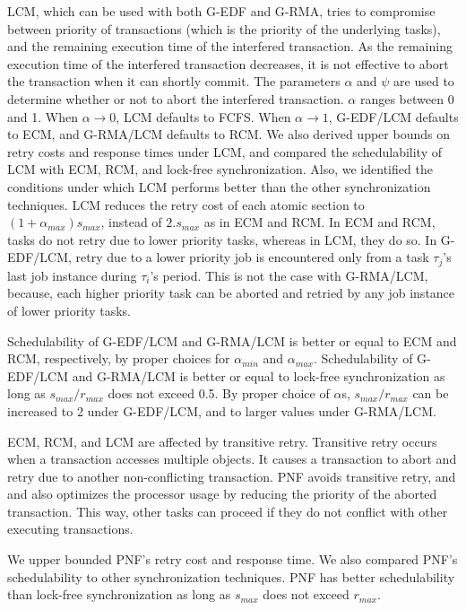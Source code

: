 \documentclass[a4paper,english]{article}
\begin{document}
LCM, which can be used with both G-EDF and G-RMA, tries to compromise between priority of transactions (which is the priority of the underlying tasks), and the remaining execution time of the interfered transaction. As the remaining execution time of the interfered transaction decreases, it is not effective to abort the transaction when it can shortly commit. The parameters $\alpha$ and $\psi$ are used to determine whether or not to abort the interfered transaction. $\alpha$ ranges between 0 and 1. When $\alpha \rightarrow 0$, LCM defaults to FCFS. When $\alpha\rightarrow1$, G-EDF/LCM defaults to ECM, and G-RMA/LCM defaults to RCM. We also derived upper bounds on retry costs and response times under LCM, and compared the schedulability of LCM with ECM, RCM, and lock-free synchronization. Also, we identified the conditions under which LCM performs better than the other synchronization techniques. LCM reduces the retry cost  of each atomic section to $(1+\alpha_{max})s_{max}$, instead of $2.s_{max}$ as in ECM and RCM. In ECM and RCM, tasks do not retry due to lower priority tasks, whereas in LCM, they do so. In G-EDF/LCM, retry due to a lower priority job is encountered only from a task $\tau_{j}$'s last job instance during $\tau_{i}$'s period. This is not the case with G-RMA/LCM, because,  each higher priority task can be aborted and retried by any job instance of lower priority tasks. 

Schedulability of G-EDF/LCM and G-RMA/LCM is better or equal to ECM and RCM, respectively, by proper choices for $\alpha_{min}$ and $\alpha_{max}$. Schedulability of G-EDF/LCM and G-RMA/LCM is better or equal to lock-free synchronization as long as $s_{max}/r_{max}$ does not exceed 0.5. By proper choice of $\alpha$s, $s_{max}/r_{max}$ can be increased to 2 under G-EDF/LCM, and to larger values under G-RMA/LCM.

ECM, RCM, and LCM are affected by transitive retry. Transitive retry occurs when a transaction accesses multiple objects. It causes a transaction to abort and retry  due to another non-conflicting transaction. PNF avoids transitive retry, and and also optimizes the processor usage by reducing the priority of the aborted transaction. This way, other tasks can proceed if they do not conflict with other executing transactions. 

We upper bounded PNF's retry cost and response time. We also compared PNF's schedulability to other synchronization techniques. PNF has better schedulability than lock-free synchronization as long as $s_{max}$ does not exceed $r_{max}$. 
\end{document}
